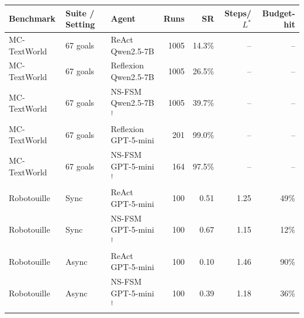 \begin{tabular}{lllrrrr}
\toprule
Benchmark & Suite / Setting & Agent & Runs & SR & Steps/$L^*$ & Budget-hit \\
\midrule
MC-TextWorld & 67 goals & ReAct Qwen2.5-7B & 1005 & 14.3\% & -- & -- \\
MC-TextWorld & 67 goals & Reflexion Qwen2.5-7B & 1005 & 26.5\% & -- & -- \\
MC-TextWorld & 67 goals & NS-FSM Qwen2.5-7B$^\dagger$ & 1005 & 39.7\% & -- & -- \\
MC-TextWorld & 67 goals & Reflexion GPT-5-mini & 201 & 99.0\% & -- & -- \\
MC-TextWorld & 67 goals & NS-FSM GPT-5-mini$^\dagger$ & 164 & 97.5\% & -- & -- \\
\midrule
Robotouille & Sync & ReAct GPT-5-mini & 100 & 0.51 & 1.25 & 49\% \\
Robotouille & Sync & NS-FSM GPT-5-mini$^\dagger$ & 100 & 0.67 & 1.15 & 12\% \\
Robotouille & Async & ReAct GPT-5-mini & 100 & 0.10 & 1.46 & 90\% \\
Robotouille & Async & NS-FSM GPT-5-mini$^\dagger$ & 100 & 0.39 & 1.18 & 36\% \\
\bottomrule
\end{tabular}
